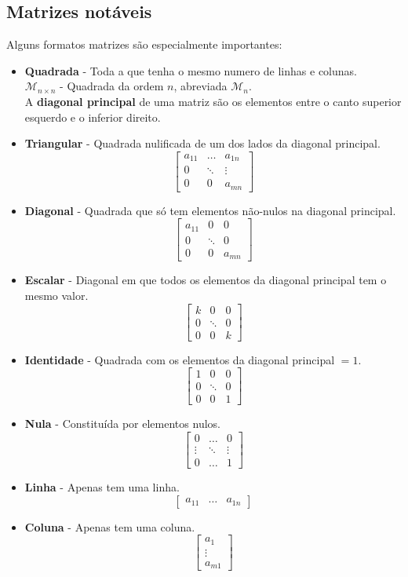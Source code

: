 \documentclass[]{report}
\begin{document}
\subsection{Matrizes notáveis}
Alguns formatos matrizes são especialmente importantes:
\begin{itemize}
\item \textbf{Quadrada} - Toda a que tenha o mesmo numero de linhas e colunas.\\
$\mathcal{M}_{n \times n}$ - Quadrada da ordem $n$, abreviada $\mathcal{M}_{n}$.\\
A \textbf{diagonal principal} de uma matriz são os elementos entre o canto superior esquerdo e o inferior direito.
\item \textbf{Triangular} - Quadrada nulificada de um dos lados da diagonal principal.
$$\begin{bmatrix}
a_{11} & \dots & a_{1n} \\
0 & \ddots & \vdots \\
0 & 0 & a_{mn}
\end{bmatrix}$$
\item \textbf{Diagonal} - Quadrada que só tem elementos não-nulos na diagonal principal.
$$\begin{bmatrix}
a_{11} & 0 & 0 \\
0 & \ddots & 0\\
0 & 0 & a_{mn}
\end{bmatrix}$$
\item \textbf{Escalar} - Diagonal em que todos os elementos da diagonal principal tem o mesmo valor.
$$\begin{bmatrix}
k & 0 & 0 \\
0 & \ddots & 0\\
0 & 0 & k
\end{bmatrix}$$
\item \textbf{Identidade} - Quadrada com os elementos da diagonal principal $=1$.
$$\begin{bmatrix}
1 & 0 & 0 \\
0 & \ddots & 0\\
0 & 0 & 1
\end{bmatrix}$$
\item \textbf{Nula} - Constituída por elementos nulos.
$$\begin{bmatrix}
0 & \dots & 0 \\
\vdots & \ddots & \vdots\\
0 & \dots & 1
\end{bmatrix}$$
\item \textbf{Linha} - Apenas tem uma linha.
$$\begin{bmatrix}
a_{11} & \dots & a_{1n}
\end{bmatrix}$$
\item \textbf{Coluna} - Apenas tem uma coluna.
$$\begin{bmatrix}
a_{1} \\
\vdots \\
a_{m1}
\end{bmatrix}$$
\end{itemize} 
\end{document}

